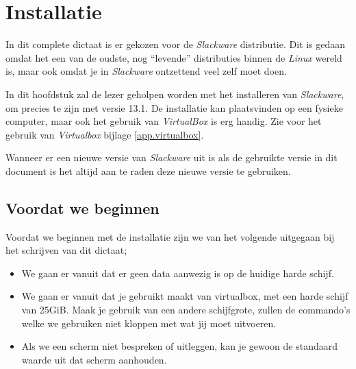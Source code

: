 %
%
%
%

\chapter{Installatie}\label{h.inst}
In dit complete dictaat is er gekozen voor de \emph{Slackware} distributie. Dit is gedaan omdat het een van de oudste, nog ``levende'' distributies binnen de \emph{Linux} wereld is, maar ook omdat je in \emph{Slackware} ontzettend veel zelf moet doen.

In dit hoofdstuk zal de lezer geholpen worden met het installeren van \emph{Slackware}, om precies te zijn met versie 13.1. De installatie kan plaatsvinden op een fysieke computer, maar ook het gebruik van \emph{VirtualBox} is erg handig. Zie voor het gebruik van \emph{Virtualbox} bijlage \ref{app.virtualbox}. 

Wanneer er een nieuwe versie van \emph{Slackware} uit is als de gebruikte versie in dit document is het altijd aan te raden deze nieuwe versie te gebruiken.

\section{Voordat we beginnen}
Voordat we beginnen met de installatie zijn we van het volgende uitgegaan bij het schrijven van dit dictaat;
\begin{itemize}
  \item We gaan er vanuit dat er geen data aanwezig is op de huidige harde schijf.
  \item We gaan er vanuit dat je gebruikt maakt van virtualbox, met een harde schijf van 25GiB. Maak je gebruik van een andere schijfgrote, zullen de commando's welke we gebruiken niet kloppen met wat jij moet uitvoeren.
  \item Als we een scherm niet bespreken of uitleggen, kan je gewoon de standaard waarde uit dat scherm aanhouden.
\end{itemize}

